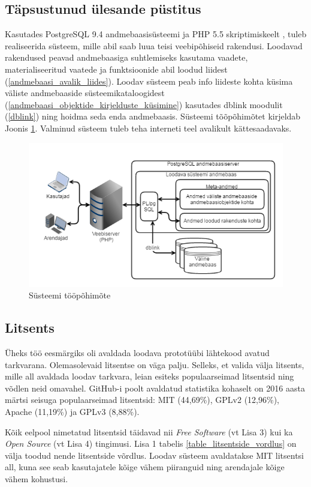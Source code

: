 \documentclass[a4paper,12pt]{article} %
\begin{document}
\subsection{Täpsustunud ülesande püstitus}
Kasutades PostgreSQL 9.4 andmebaasisüsteemi \cite{PostgreSQL} ja PHP 5.5 skriptimiskeelt \cite{PHP}, tuleb realiseerida süsteem, mille abil saab luua teisi veebipõhiseid rakendusi. Loodavad rakendused peavad andmebaasiga suhtlemiseks kasutama vaadete, materialiseeritud vaatede ja funktsioonide abil loodud liidest (\ref{andmebaasi_avalik_liides}). Loodav süsteem peab info liideste kohta küsima väliste andmebaaside süsteemikataloogidest (\ref{andmebaasi_objektide_kirjelduste_küsimine}) kasutades dblink moodulit (\ref{dblink}) ning hoidma seda enda andmebaasis. Süsteemi tõõpõhimõtet kirjeldab Joonis \ref{fig_süsteemi_tööpõhimõte}. Valminud süsteem tuleb teha interneti teel avalikult kättesaadavaks.

\begin{figure}[H]
\centering
\includegraphics[width=\textwidth]{./diagrams/how-should-pgapex-work.png}
\caption{Süsteemi tööpõhimõte}
\label{fig_süsteemi_tööpõhimõte}
\end{figure}

\subsection{Litsents}
Üheks töö eesmärgiks oli avaldada loodava prototüübi lähtekood avatud tarkvarana. Olemasolevaid litsentse on väga palju. Selleks, et valida välja litsents, mille all avaldada loodav tarkvara, leian esiteks populaarseimad litsentsid ning võdlen neid omavahel.
GitHub-i poolt avaldatud statistika kohaselt on 2016 aasta märtsi seisuga populaarseimad litsentsid: MIT (44,69\%), GPLv2 (12,96\%), Apache (11,19\%) ja GPLv3 (8,88\%). \cite{GitHub_Opensource_Licence_Usage}\par
Kõik eelpool nimetatud litsentsid täidavad nii \textit{Free Software} (vt Lisa 3) kui ka \textit{Open Source} (vt Lisa 4) tingimusi. Lisa 1 tabelis \ref{table_litsentside_vordlus} on välja toodud nende litsentside võrdlus.
Loodav süsteem avaldatakse MIT litsentsi all, kuna see seab kasutajatele kõige vähem piiranguid ning arendajale kõige vähem kohustusi.
\end{document}

